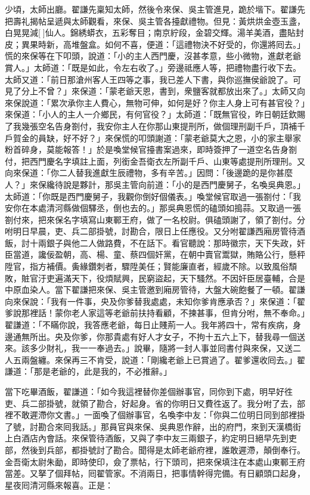 少頃，太師出廳。翟謙先稟知太師，然後令來保、吳主管進見，跪於堦下。翟謙先把壽礼揭帖呈遞與太師觀看，來保、吳主管各擡獻禮物。但見：黃烘烘金壺玉盞，白晃晃減[]仙人。錦綉蟒衣，五彩奪目；南京紵段，金碧交輝。湯羊美酒，盡貼封皮；異果時新，高堆盤盒。{}如何不喜，便道：「這禮物決不好受的，你還將囘去。」慌的來保等在下叩頭，說道：「小的主人西門慶，沒甚孝意，些小微物，進獻老爺賞人。」太師道：「既是如此，令左右收了。」旁邊祗應人等，把禮物盡行收下去。太師又道：「前日那滄州客人王四等之事，我已差人下書，與你巡撫侯爺說了。可見了分上不曾？」{}來保道：「蒙老爺天恩，書到，衆鹽客就都放出來了。」太師又向來保說道：「累次承你主人費心，無物可伸，如何是好？你主人身上可有甚官役？」來保道：「小人的主人一介鄉民，有何官役？」太師道：「既無官役，昨日朝廷欽賜了我幾張空名告身劄付，我安你主人在你那山東提刑所，做個理刑副千戶，頂補千戶賀金的員缺，好不好？」來保慌的叩頭謝道：「蒙老爺莫大之恩，小的家主舉家粉首碎身，莫能報答！」於是喚堂候官擡書案過來，即時簽押了一道空名告身劄付，把西門慶名字填註上面，列銜金吾衛衣左所副千戶、山東等處提刑所理刑。又向來保道：「你二人替我進獻生辰禮物，多有辛苦。」因問：「後邊跪的是你甚麼人？」來保纔待說是夥計，那吳主管向前道：「小的是西門慶舅子，名喚吳典恩。」{}太師道：「你既是西門慶舅子，我觀你倒好個儀表。」喚堂候官取過一張劄付：「我安你在本處清河縣做個驛丞，倒也去的。」那吳典恩慌的磕頭如搗蒜。又取過一張劄付來，把來保名字填寫山東鄆王府，做了一名校尉。俱磕頭謝了，領了劄付。分咐明日早晨，吏、兵二部掛號，討勘合，限日上任應役。又分咐翟謙西廂房管待酒飯，討十兩銀子與他二人做路費，不在話下。看官聽說：那時徽宗，天下失政，奸臣當道，讒佞盈朝，高、楊、童、蔡四個奸黨，在朝中賣官鬻獄，賄賂公行，懸秤陞官，指方補價。夤緣鑽刺者，驟陞美任；賢能廉直者，經歲不除。以致風俗頹敗，賍官汙吏遍滿天下，役煩賦興，民窮盜起，天下騷然。不因奸臣居臺輔，合是中原血染人。當下翟謙把來保、吳主管邀到廂房管待，大盤大碗飽餐了一頓。翟謙向來保說：「我有一件事，央及你爹替我處處，未知你爹肯應承否？」來保道：「翟爹說那裡話！蒙你老人家這等老爺前扶持看顧，不揀甚事，但肯分咐，無不奉命。」翟謙道：「不瞞你說，我答應老爺，每日止賤荊一人。我年將四十，常有疾病，身邊通無所出。央及你爹，你那貴處有好人才女子，不拘十五六上下，替我尋一個送來。該多少財礼，我一一奉過去。」{}說畢，隨將一封人事並囘書付與來保，又送二人五兩盤纏。來保再三不肯受，說道：「剛纔老爺上已賞過了。翟爹還收囘去。」翟謙道：「那是老爺的，此是我的，不必推辭。」

當下吃畢酒飯，翟謙道：「如今我這裡替你差個辦事官，同你到下處，明早好徃吏、兵二部掛號，就領了勘合，好起身。省的你明日又費徃返了。我分咐了去，部裡不敢遲滯你文書。」一面喚了個辦事官，名喚李中友：「你與二位明日同到部裡掛了號，討勘合來囘我話。」那員官與來保、吳典恩作辭，出的府門，來到天漢橋街上白酒店內會話。來保管待酒飯，又與了李中友三兩銀子，約定明日絕早先到吏部，然後到兵部，都掛號討了勘合。聞得是太師老爺府裡，誰敢遲滯，顛倒奉行。金吾衛太尉朱勔，即時使印，僉了票帖，行下頭司，把來保填注在本處山東鄆王府當差。又拏了個拜帖，囘翟管家。{}不消兩日，把事情幹得完備。有日顧頭口起身，星夜囘清河縣來報喜。正是：

